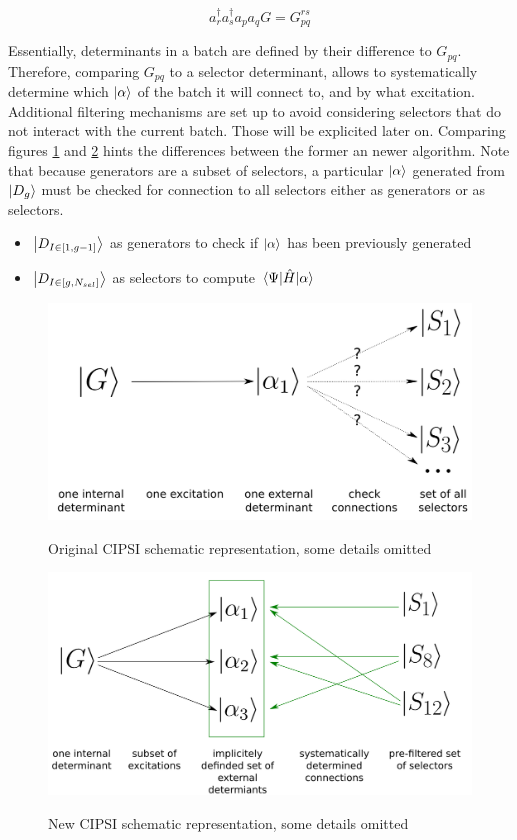 \documentclass[./thesis.tex]{subfiles}
\begin{document}
\begin{equation}
a^\dagger_r a^\dagger_s a_p a_q  G = G^{rs}_{pq}
\end{equation}

Essentially, determinants in a batch are defined by their difference to $G_{pq}$. Therefore, comparing $G_{pq}$ to a selector determinant, allows to systematically determine which ${\ket{\alpha}}$ of the batch it will connect to, and by what excitation. Additional filtering mechanisms are set up to avoid considering selectors that do not interact with the current batch. Those will be explicited later on. Comparing figures \ref{fig:old_cipsi} and \ref{fig:new_cipsi} hints the differences between the former an newer algorithm. Note that because generators are a subset of selectors, a particular ${\ket{\alpha}}$ generated from $\ket {D_g}$ must be checked for connection to all selectors either as generators or as selectors.

\begin{itemize}
\item
$\ket {D_{I \in [1,g-1]}}$ as generators to check if ${\ket{\alpha}}$ has been previously generated
\item
$\ket {D_{I \in [g,N_{sel}]}}$ as selectors to compute $\mel{\Psi}{\hat{H}}{\alpha}$
\end{itemize}


\begin{figure}[h!]
	\begin{center}
		\includegraphics[width=0.7\columnwidth]{figures/cipsi/old_cipsi}
		\label{fig:old_cipsi}
		\caption{Original CIPSI schematic representation, some details omitted}
	\end{center}
\end{figure}


\begin{figure}[h!]
	\begin{center}
		\includegraphics[width=0.7\columnwidth]{figures/cipsi/new_cipsi}
		\label{fig:new_cipsi}
		\caption{New CIPSI schematic representation, some details omitted}
	\end{center}
\end{figure}
\end{document}
